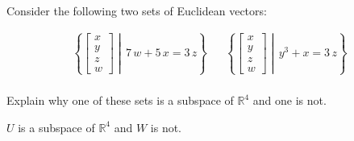 
\begin{exerciseStatement}


Consider the following two sets of Euclidean vectors: 


\begin{align*}  \left\{ \left[\begin{array}{c}
x \\
y \\
z \\
w
\end{array}\right] \middle|\,7 \, w + 5 \, x = 3 \, z\right\}  & &   \left\{ \left[\begin{array}{c}
x \\
y \\
z \\
w
\end{array}\right] \middle|\,y^{3} + x = 3 \, z\right\}  \\ \end{align*}
            

 Explain why one of these sets is a subspace of \(\mathbb{R}^ 4 \) and one is not. 


\end{exerciseStatement}
    
\begin{exerciseAnswer} 


\(U\) is a subspace of \(\mathbb{R}^ 4 \) and \(W\) is not.


\end{exerciseAnswer}
    
